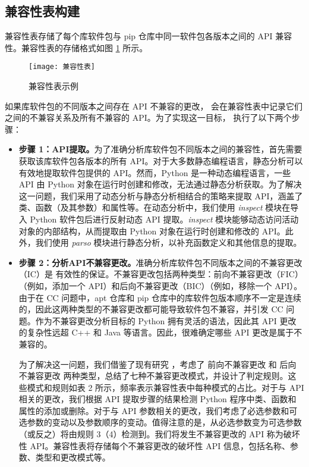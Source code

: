\subsection{兼容性表构建}\label{4.1.3}
兼容性表存储了每个库软件包与 pip 仓库中同一软件包各版本之间的 API 兼容性。兼容性表的存储格式如图 \ref{fig:compatibility} 所示。
\begin{figure}[htbp] %
	\centering
	\texttt{[image: 兼容性表]}
	\caption{兼容性表示例}
	\label{fig:compatibility}
\end{figure}如果库软件包的不同版本之间存在 API 不兼容的更改，\tool{} 会在兼容性表中记录它们之间的不兼容关系及所有不兼容的 API。为了实现这一目标，\tool{} 执行了以下两个步骤：
\begin{itemize}
	\item \textbf{步骤 1：API提取。}为了准确分析库软件包不同版本之间的兼容性，首先需要获取该库软件包各版本的所有 API。对于大多数静态编程语言，静态分析可以有效地提取软件包提供的 API。然而，Python 是一种动态编程语言，一些 API 由 Python 对象在运行时创建和修改，无法通过静态分析获取。为了解决这一问题，我们采用了动态分析与静态分析相结合的策略来提取 API，涵盖了类、函数（及其参数）和属性等。在动态分析中，我们使用 \textit{inspect} 模块在导入 Python 软件包后进行反射动态 API 提取。\textit{inspect} 模块能够动态访问活动对象的内部结构，从而提取由 Python 对象在运行时创建和修改的 API。此外，我们使用 \textit{parso}  模块进行静态分析，以补充函数定义和其他信息的提取。
	
	\item \textbf{步骤 2：分析API不兼容更改。}准确分析库软件包不同版本之间的不兼容更改（IC）是 \tool{}有效性的保证。不兼容更改包括两种类型：前向不兼容更改（FIC）（例如，添加一个 API）和后向不兼容更改（BIC）（例如，移除一个 API）。由于在 CC 问题中，apt 仓库和 pip 仓库中的库软件包版本顺序不一定是连续的，因此这两种类型的不兼容更改都可能导致软件包不兼容，并引发 CC 问题。作为不兼容更改分析目标的 Python 拥有灵活的语法，因此其 API 更改的复杂性远超 C++ 和 Java 等语言。因此，很难确定哪些 API 更改是属于不兼容的。
	
	为了解决这一问题，我们借鉴了现有研究 \cite{zhang2020python}，考虑了 前向不兼容更改 和 后向不兼容更改 两种类型，总结了七种不兼容更改模式，并设计了判定规则。这些模式和规则如表 2 所示，频率表示兼容性表中每种模式的占比。对于与 API 相关的更改，我们根据 API 提取步骤的结果检测 Python 程序中类、函数和属性的添加或删除。对于与 API 参数相关的更改，我们考虑了必选参数和可选参数的变动以及参数顺序的变动。值得注意的是，从必选参数变为可选参数（或反之）将由规则 3（4）检测到。我们将发生不兼容更改的 API 称为破坏性 API。兼容性表将存储每个不兼容更改的破坏性 API 信息，包括名称、参数、类型和更改模式等。

\end{itemize}

